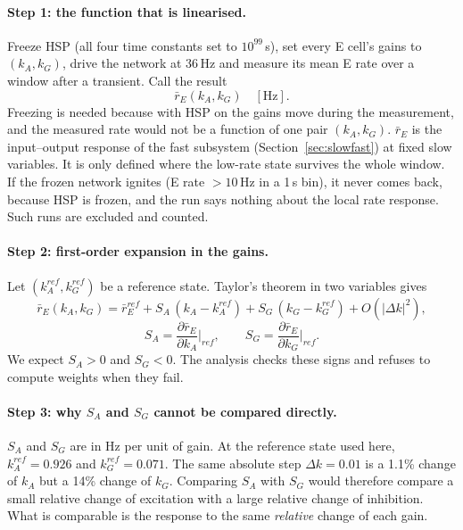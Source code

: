 \documentclass[11pt]{article}
\newcommand{\kA}{k_A}
\newcommand{\kG}{k_G}
\begin{document}
\paragraph{Step 1: the function that is linearised.}
Freeze HSP (all four time constants set to $10^{99}$\,s), set every E cell's gains to $(\kA,\kG)$, drive the network at
36\,Hz and measure its mean E rate over a window after a transient. Call the result
\[
\bar r_E(\kA,\kG) \quad [\mathrm{Hz}].
\]
Freezing is needed because with HSP on the gains move during the measurement, and the measured rate would not be a
function of one pair $(\kA,\kG)$. $\bar r_E$ is the input--output response of the fast subsystem (Section~\ref{sec:slowfast}) at fixed slow
variables. It is only defined where the low-rate state survives the whole window. If
the frozen network ignites (E rate $>10$\,Hz in a 1\,s bin), it never comes back, because HSP is frozen, and the run says
nothing about the local rate response. Such runs are excluded and counted.

\paragraph{Step 2: first-order expansion in the gains.}
Let $(\kA^{ref},\kG^{ref})$ be a reference state. Taylor's theorem in two variables gives
\begin{equation}
\bar r_E(\kA,\kG) = \bar r_E^{ref} + S_A\,(\kA-\kA^{ref}) + S_G\,(\kG-\kG^{ref}) + O\!\left(|\Delta k|^2\right),
\label{eq:lin}\end{equation}
\[
S_A = \frac{\partial\bar r_E}{\partial\kA}\Big|_{ref},\qquad S_G = \frac{\partial\bar r_E}{\partial\kG}\Big|_{ref}.
\]
We expect $S_A>0$ and $S_G<0$. The analysis checks these signs and refuses to compute weights when they fail.

\paragraph{Step 3: why $S_A$ and $S_G$ cannot be compared directly.}
$S_A$ and $S_G$ are in Hz per unit of gain. At the reference state used here, $\kA^{ref}=0.926$ and $\kG^{ref}=0.071$.
The same absolute step $\Delta k=0.01$ is a 1.1\% change of $\kA$ but a 14\% change of $\kG$. Comparing $S_A$ with $S_G$
would therefore compare a small relative change of excitation with a large relative change of inhibition. What is
comparable is the response to the same \emph{relative} change of each gain.
\end{document}

